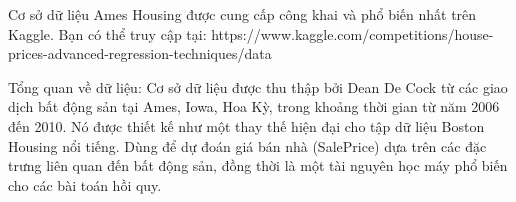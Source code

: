 


Cơ sở dữ liệu Ames Housing được cung cấp công khai và phổ biến nhất trên Kaggle. Bạn có thể truy cập tại: https://www.kaggle.com/competitions/house-prices-advanced-regression-techniques/data

Tổng quan về dữ liệu: Cơ sở dữ liệu được thu thập bởi Dean De Cock từ các giao dịch bất động sản tại Ames, Iowa, Hoa Kỳ, trong khoảng thời gian từ năm 2006 đến 2010. Nó được thiết kế như một thay thế hiện đại cho tập dữ liệu Boston Housing nổi tiếng. Dùng để dự đoán giá bán nhà (SalePrice) dựa trên các đặc trưng liên quan đến bất động sản, đồng thời là một tài nguyên học máy phổ biến cho các bài toán hồi quy.


